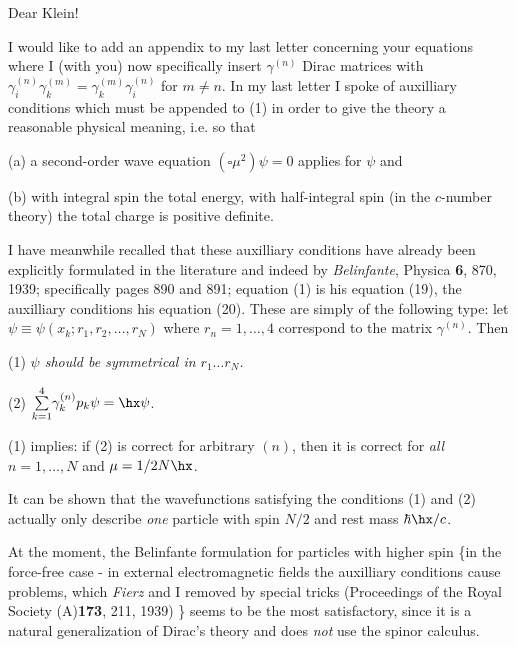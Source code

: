 \date{January 28, 1941}

Dear Klein!

I would like to add an appendix to my last letter concerning your equations
where I (with you) now specifically insert
$\gamma^{(n)}$ Dirac matrices with $\gamma_i^{(n)}\gamma_k^{(m)} = \gamma_k^{(m)}\gamma_i^{(n)}$ for $m \neq n$. In my last letter I spoke of auxilliary conditions which must be appended to (1) in order to give the theory a reasonable physical meaning, i.e. so that

(a) a second-order wave equation $(\square \mu^2)\psi = 0$ applies for $\psi$ and

(b) with integral spin the total energy, with half-integral spin (in the $c$-number theory) the total charge is positive definite.

I have meanwhile recalled that these auxilliary conditions have already been explicitly formulated in the literature and indeed by \textit{Belinfante}, Physica \textbf{6}, 870, 1939; specifically pages 890 and 891; equation (1) is his equation (19), the auxilliary conditions his equation (20). These are simply of the following type: let $\psi \equiv \psi(x_k; r_1, r_2, \dots, r_N)$ where $r_n=1,\dots,4$ correspond to the matrix $\gamma^{(n)}$. Then

(1) \textit{$\psi$ should be symmetrical in $r_1 \dots r_N$.}

(2) $\sumXY{k=1}{4}\gamma_k^{(n)}p_k\psi = \hx\psi$.

(1) implies: if (2) is correct for arbitrary $(n)$, then it is correct for \textit{all} $n=1,\dots,N$ and $\mu=1/2 N\hx$.

It can be shown that the wavefunctions satisfying the conditions (1) and (2) actually only describe \textit{one} particle with spin $N/2$ and rest mass $\hbar\hx/c$.

At the moment, the Belinfante formulation for particles with higher spin \{in the force-free case - in external electromagnetic fields the auxilliary conditions cause problems, which \textit{Fierz} and I removed by special tricks (Proceedings of the Royal Society (A)\textbf{173}, 211, 1939) \} seems to be the most satisfactory, since it is a natural generalization of Dirac's theory and does \textit{not} use the spinor calculus.

